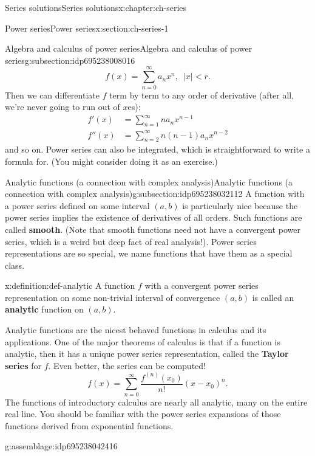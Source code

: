 \documentclass[oneside,10pt,]{book}
\newcommand{\terminology}[1]{\textbf{#1}}
\numberwithin{equation}{section}
\newcommand{\abs}[1]{\left\vert#1\right\vert}
\numberwithin{equation}{section}
\newcommand{\ps}{\displaystyle \sum_{n=0}^\infty a_n x^n}
\newcommand{\lt}{<}
\newcommand{\amp}{&}
\begin{document}
\begin{chapterptx}{Series solutions}{}{Series solutions}{}{}{x:chapter:ch-series}
\begin{sectionptx}{Power series}{}{Power series}{}{}{x:section:ch-series-1}
\begin{subsectionptx}{Algebra and calculus of power series}{}{Algebra and calculus of power series}{}{}{g:subsection:idp695238008016}
\begin{equation*}
f(x) = \ps, \,\,\, \abs{x} \lt r.
\end{equation*}
Then we can differentiate \(f\) term by term to any order of derivative (after all, we're never going to run out of \(x\)es):%
\begin{align*}
f'(x) \amp= \sum_{n=1}^\infty n a_n x^{n-1}\\
f''(x) \amp = \sum_{n=2}^\infty n(n-1) a_n x^{n-2}
\end{align*}
and so on. Power series can also be integrated, which is straightforward to write a formula for. (You might consider doing it as an exercise.)%
\end{subsectionptx}
%
%
\typeout{************************************************}
\typeout{************************************************}
%
\begin{subsectionptx}{Analytic functions (a connection with complex analysis)}{}{Analytic functions (a connection with complex analysis)}{}{}{g:subsection:idp695238032112}
A function with a power series defined on some interval \((a,b)\) is particularly nice because the power series implies the existence of derivatives of all orders. Such functions are called \terminology{smooth}. (Note that smooth functions need not have a convergent power series, which is a weird but deep fact of real analysis!). Power series representations are so special, we name functions that have them as a special class.%
\begin{definition}{}{x:definition:def-analytic}%
A function \(f\) with a convergent power series representation on some non-trivial interval of convergence \((a,b)\) is called an \terminology{analytic} function on \((a,b)\).%
\end{definition}
Analytic functions are the nicest behaved functions in calculus and its applications. One of the major theorems of calculus is that if a function is analytic, then it has a unique power series representation, called the \terminology{Taylor series} for \(f\). Even better, the series can be computed!%
%
\begin{equation*}
f(x) = \sum_{n=0}^\infty \frac{f^{(n)}(x_0)}{n!} (x  -x_0)^n.
\end{equation*}
The functions of introductory calculus are nearly all analytic, many on the entire real line. You should be familiar with the power series expansions of those functions derived from exponential functions.%
\begin{assemblage}{}{g:assemblage:idp695238042416}%

\end{assemblage}
\end{subsectionptx}
\end{sectionptx}
\end{chapterptx}
\end{document}
